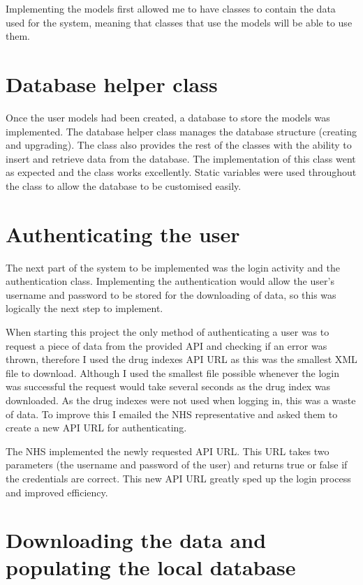 Implementing the models first allowed me to have classes to contain the data used for the system, meaning that classes that use the models will be able to use them.

\section{Database helper class}

Once the user models had been created, a database to store the models was implemented. The database helper class manages the database structure (creating and upgrading). The class also provides the rest of the classes with the ability to insert and retrieve data from the database. The implementation of this class went as expected and the class works excellently. Static variables were used throughout the class to allow the database to be customised easily.

\section{Authenticating the user}
The next part of the system to be implemented was the login activity and the authentication class. Implementing the authentication would allow the user's username and password to be stored for the downloading of data, so this was logically the next step to implement.

When starting this project the only method of authenticating a user was to request a piece of data from the provided API and checking if an error was thrown, therefore I used the drug indexes API URL as this was the smallest XML file \cite{xml} to download. Although I used the smallest file possible whenever the login was successful the request would take several seconds as the drug index was downloaded. As the drug indexes were not used when logging in, this was a waste of data. To improve this I emailed the NHS representative and asked them to create a new API URL for authenticating.

The NHS \cite{nhs_website} implemented the newly requested API URL. This URL takes two parameters (the username and password of the user) and returns true or false if the credentials are correct. This new API URL greatly sped up the login process and improved efficiency.

\section{Downloading the data and populating the local database}

